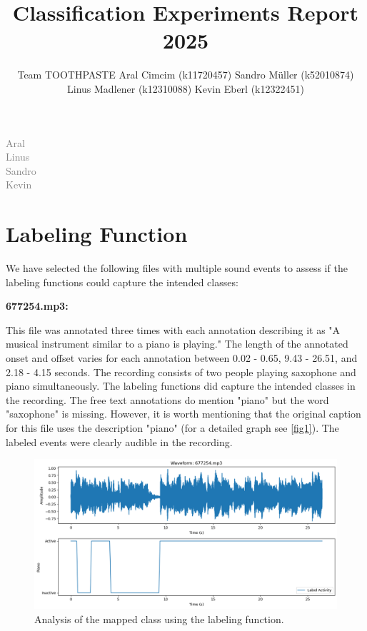 \documentclass{article}
\title{Classification Experiments Report 2025}
\author{%
  Team TOOTHPASTE \AND
  Aral Cimcim (k11720457)
  \And
  Sandro Müller (k52010874)
  \And 
  Linus Madlener (k12310088)
  \And 
  Kevin Eberl (k12322451)
}
\begin{document}
\maketitle

\begin{contributions}
    \textcolor{gray}{
    Aral \\
    Linus \\
    Sandro \\
    Kevin \\
    }
  
\end{contributions}

\section{Labeling Function}
We have selected the following files with multiple sound events to assess if the labeling functions could capture the intended classes:

\textbf{677254.mp3:}

This file was annotated three times with each annotation describing it as "A musical instrument similar to a piano is playing." The length of the annotated onset and offset varies for each annotation between 0.02 - 0.65, 9.43 - 26.51, and 2.18 - 4.15 seconds. The recording consists of two people playing saxophone and piano simultaneously. The labeling functions did capture the intended classes in the recording. The free text annotations do mention "piano" but the word "saxophone" is missing. However, it is worth mentioning that the original caption for this file uses the description "piano" (for a detailed graph see \autoref{fig1}). The labeled events were clearly audible in the recording.

\begin{figure}
  \centering
  \includegraphics[width=\linewidth]{output1.png}
  \caption{Analysis of the mapped class using the labeling function.}
  \label{fig1}
\end{figure}
\end{document}
